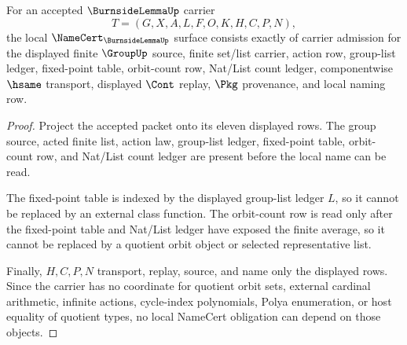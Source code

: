 \begin{theorem}
\label{thm:burnside-lemma-namecert-obligations}
For an accepted $\BurnsideLemmaUp$ carrier
$$
T=(G,X,A,L,F,O,K,H,C,P,N),
$$
the local $\NameCert_{\BurnsideLemmaUp}$ surface consists exactly of carrier admission for the displayed finite $\GroupUp$ source, finite set/list carrier, action row, group-list ledger, fixed-point table, orbit-count row, Nat/List count ledger, componentwise $\hsame$ transport, displayed $\Cont$ replay, $\Pkg$ provenance, and local naming row.
\end{theorem}
\begin{proof}
Project the accepted packet onto its eleven displayed rows. The group source, acted finite list, action law, group-list ledger, fixed-point table, orbit-count row, and Nat/List count ledger are present before the local name can be read.

The fixed-point table is indexed by the displayed group-list ledger $L$, so it cannot be replaced by an external class function. The orbit-count row is read only after the fixed-point table and Nat/List ledger have exposed the finite average, so it cannot be replaced by a quotient orbit object or selected representative list.

Finally, $H,C,P,N$ transport, replay, source, and name only the displayed rows. Since the carrier has no coordinate for quotient orbit sets, external cardinal arithmetic, infinite actions, cycle-index polynomials, Polya enumeration, or host equality of quotient types, no local NameCert obligation can depend on those objects.
\end{proof}

